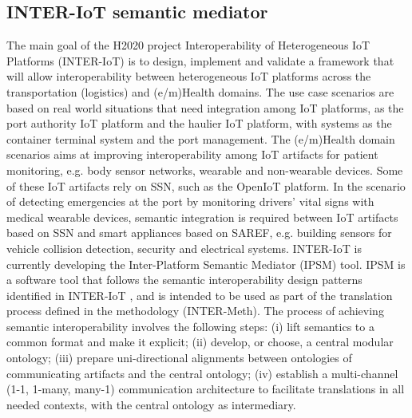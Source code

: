 \documentclass{sig-alternate-05-2015}
\begin{document}
\subsection{INTER-IoT semantic mediator}
The main goal of the H2020 project Interoperability of Heterogeneous IoT Platforms (INTER-IoT) \cite{Ganzha2017a,Ganzha2016} is to design, implement and validate a framework that will allow interoperability between heterogeneous IoT platforms across the transportation (logistics) and (e/m)Health domains. The use case scenarios are based on real world situations that need integration among IoT platforms, as the port authority IoT platform and the haulier IoT platform, with systems as the container terminal system and the port management. The (e/m)Health domain scenarios aims at improving interoperability among IoT artifacts for patient monitoring, e.g. body sensor networks, wearable and non-wearable devices. Some of these IoT artifacts rely on SSN, such as the OpenIoT platform. In the scenario of detecting emergencies at the port by monitoring drivers' vital signs with medical wearable devices, semantic integration is required between IoT artifacts based on SSN and smart appliances based on SAREF, e.g. building sensors for vehicle collision detection, security and electrical systems. INTER-IoT is currently developing the  Inter-Platform Semantic Mediator (IPSM) tool. IPSM is a software tool that follows the semantic interoperability design patterns identified in INTER-IoT \cite{Ganzha2017a}, and is intended to be used as part of the translation process defined in the methodology (INTER-Meth). The process of achieving semantic interoperability involves the following steps: (i) lift semantics to a common format and make it explicit\cite{Ganzha2017a}; (ii) develop, or choose, a central modular ontology; (iii) prepare uni-directional alignments between ontologies of communicating artifacts and the central ontology; (iv) establish a multi-channel (1-1, 1-many, many-1) communication architecture to facilitate translations in all needed contexts, with the central ontology as intermediary.

\end{document}

